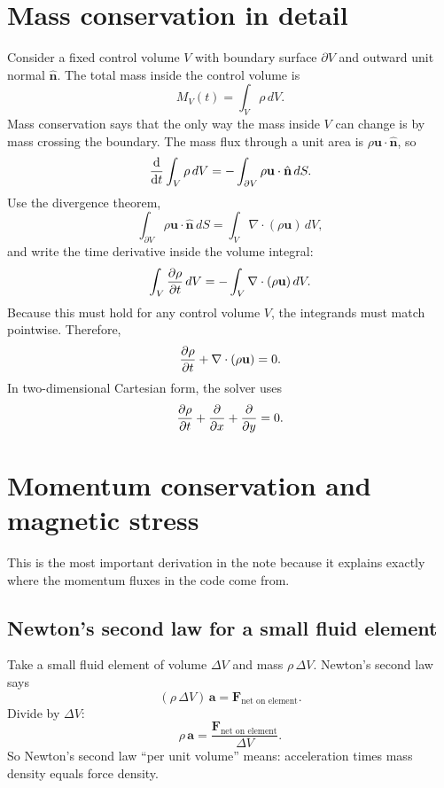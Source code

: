 \documentclass[11pt]{article}
\newcommand{\uvec}{\mathbf{u}}
\begin{document}
\section{Mass conservation in detail}
Consider a fixed control volume $V$ with boundary surface $\partial V$ and outward unit normal $\hat{\mathbf{n}}$. The total mass inside the control volume is
\begin{equation}
M_V(t)=\int_V \rho\, dV.
\label{eq:mass-control}
\end{equation}
Mass conservation says that the only way the mass inside $V$ can change is by mass crossing the boundary. The mass flux through a unit area is $\rho \uvec\cdot\hat{\mathbf{n}}$, so
\begin{equation}
\dv{}{t}\int_V \rho\, dV = -\int_{\partial V} \rho\uvec\cdot\hat{\mathbf{n}}\, dS.
\label{eq:mass-integral}
\end{equation}
Use the divergence theorem,
\begin{equation}
\int_{\partial V} \rho\uvec\cdot\hat{\mathbf{n}}\, dS = \int_V \nabla\cdot(\rho\uvec)\, dV,
\label{eq:div-thm-mass}
\end{equation}
and write the time derivative inside the volume integral:
\begin{equation}
\int_V \pdv{\rho}{t}\, dV = -\int_V \nabla\cdot(\rho\uvec)\, dV.
\label{eq:mass-volume-form}
\end{equation}
Because this must hold for any control volume $V$, the integrands must match pointwise. Therefore,
\begin{equation}
\pdv{\rho}{t} + \nabla\cdot(\rho\uvec)=0.
\label{eq:mass}
\end{equation}
In two-dimensional Cartesian form, the solver uses
\begin{equation}
\pdv{\rho}{t} + \pdv{}{x}(\rho u_x) + \pdv{}{y}(\rho u_y)=0.
\label{eq:mass2d}
\end{equation}

\section{Momentum conservation and magnetic stress}
This is the most important derivation in the note because it explains exactly where the momentum fluxes in the code come from.

\subsection{Newton's second law for a small fluid element}
Take a small fluid element of volume $\Delta V$ and mass $\rho\,\Delta V$. Newton's second law says
\begin{equation}
(\rho\,\Delta V)\,\mathbf{a} = \mathbf{F}_{\text{net on element}}.
\label{eq:newton-small-element}
\end{equation}
Divide by $\Delta V$:
\begin{equation}
\rho\,\mathbf{a} = \frac{\mathbf{F}_{\text{net on element}}}{\Delta V}.
\label{eq:newton-per-volume}
\end{equation}
So Newton's second law ``per unit volume'' means: acceleration times mass density equals force density.
\end{document}

